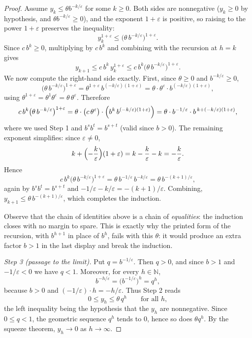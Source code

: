 \begin{proof}
Assume $y_k\le\theta b^{-k/\varepsilon}$ for some $k\ge0$.  Both sides are
nonnegative ($y_k\ge0$ by hypothesis, and $\theta b^{-k/\varepsilon}\ge0$), and
the exponent $1+\varepsilon$ is positive, so raising to the power
$1+\varepsilon$ preserves the inequality:
\[
y_k^{1+\varepsilon}\le\bigl(\theta\,b^{-k/\varepsilon}\bigr)^{1+\varepsilon}.
\]
Since $c\,b^{k}\ge0$, multiplying by $c\,b^{k}$ and combining with the recursion
at $h=k$ gives
\[
y_{k+1}\le c\,b^{k}\,y_k^{1+\varepsilon}
\le c\,b^{k}\bigl(\theta\,b^{-k/\varepsilon}\bigr)^{1+\varepsilon}.
\]
We now compute the right-hand side exactly.  First, since
$\theta\ge0$ and $b^{-k/\varepsilon}\ge0$,
\[
\bigl(\theta\,b^{-k/\varepsilon}\bigr)^{1+\varepsilon}
=\theta^{1+\varepsilon}\,b^{(-k/\varepsilon)(1+\varepsilon)}
=\theta\cdot\theta^{\varepsilon}\cdot b^{(-k/\varepsilon)(1+\varepsilon)} ,
\]
using $\theta^{1+\varepsilon}=\theta^{1}\theta^{\varepsilon}=\theta\,\theta^{\varepsilon}$.
Therefore
\[
c\,b^{k}\bigl(\theta\,b^{-k/\varepsilon}\bigr)^{1+\varepsilon}
=\theta\cdot\bigl(c\,\theta^{\varepsilon}\bigr)\cdot
  \Bigl(b^{k}\,b^{(-k/\varepsilon)(1+\varepsilon)}\Bigr)
=\theta\cdot b^{-1/\varepsilon}\cdot b^{\,k+(-k/\varepsilon)(1+\varepsilon)} ,
\]
where we used Step 1 and $b^{s}b^{t}=b^{s+t}$ (valid since $b>0$).  The
remaining exponent simplifies: since $\varepsilon\neq0$,
\[
k+\Bigl(-\frac k\varepsilon\Bigr)(1+\varepsilon)
=k-\frac k\varepsilon-k=-\frac k\varepsilon .
\]
Hence
\[
c\,b^{k}\bigl(\theta\,b^{-k/\varepsilon}\bigr)^{1+\varepsilon}
=\theta\,b^{-1/\varepsilon}\,b^{-k/\varepsilon}
=\theta\,b^{-(k+1)/\varepsilon},
\]
again by $b^{s}b^{t}=b^{s+t}$ and
$-1/\varepsilon-k/\varepsilon=-(k+1)/\varepsilon$.  Combining,
$y_{k+1}\le\theta\,b^{-(k+1)/\varepsilon}$, which completes the induction.

Observe that the chain of identities above is a chain of \emph{equalities}: the
induction closes with no margin to spare.  This is exactly why the printed form
of the recursion, with $b^{h+1}$ in place of $b^{h}$, fails with this
$\theta$: it would produce an extra factor $b>1$ in the last display and break
the induction.

\emph{Step 3 (passage to the limit).}  Put $q=b^{-1/\varepsilon}$.  Then $q>0$,
and since $b>1$ and $-1/\varepsilon<0$ we have $q<1$.  Moreover, for every
$h\in\mathbb N$,
\[
b^{-h/\varepsilon}=\bigl(b^{-1/\varepsilon}\bigr)^{h}=q^{h},
\]
because $b>0$ and $(-1/\varepsilon)\cdot h=-h/\varepsilon$.  Thus Step 2 reads
\[
0\le y_h\le\theta\,q^{h}\qquad\text{for all }h,
\]
the left inequality being the hypothesis that the $y_h$ are nonnegative.  Since
$0\le q<1$, the geometric sequence $q^h$ tends to $0$, hence so does
$\theta q^{h}$.  By the squeeze theorem, $y_h\to0$ as $h\to\infty$.
\end{proof}
